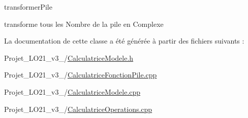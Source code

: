 transformer\-Pile 

transforme tous les Nombre de la pile en Complexe 

La documentation de cette classe a été générée à partir des fichiers suivants \-:\begin{DoxyCompactItemize}
\item 
Projet\-\_\-\-L\-O21\-\_\-v3\-\_/\hyperlink{_calculatrice_modele_8h}{Calculatrice\-Modele.\-h}\item 
Projet\-\_\-\-L\-O21\-\_\-v3\-\_/\hyperlink{_calculatrice_fonction_pile_8cpp}{Calculatrice\-Fonction\-Pile.\-cpp}\item 
Projet\-\_\-\-L\-O21\-\_\-v3\-\_/\hyperlink{_calculatrice_modele_8cpp}{Calculatrice\-Modele.\-cpp}\item 
Projet\-\_\-\-L\-O21\-\_\-v3\-\_/\hyperlink{_calculatrice_operations_8cpp}{Calculatrice\-Operations.\-cpp}\end{DoxyCompactItemize}
